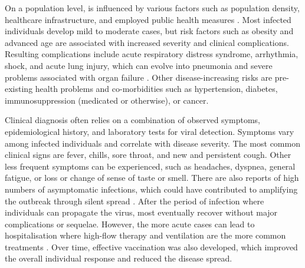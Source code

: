 On a population level, \covid is influenced by various factors such as population density, healthcare infrastructure, and employed public health measures \citep{halaji2021EpidemiologyCOVID19}.
Most infected individuals develop mild to moderate cases, but risk factors such as obesity and advanced age are associated with increased severity and clinical complications.
Resulting complications include acute respiratory distress syndrome, arrhythmia, shock, and acute lung injury, which can evolve into pneumonia and severe problems associated with organ failure \citep{wang2020ClinicalCharacteristics, lamers2022SARSCoV2Pathogenesis}.
Other disease-increasing risks are pre-existing health problems and co-morbidities such as hypertension, diabetes, immunosuppression (medicated or otherwise), or cancer.


Clinical diagnosis often relies on a combination of observed symptoms, epidemiological history, and laboratory tests for viral detection.
Symptoms vary among infected individuals and correlate with disease severity.
The most common clinical signs are fever, chills, sore throat, and new and persistent cough.
Other less frequent symptoms can be experienced, such as headaches, dyspnea, general fatigue, or loss or change of sense of taste or smell.
There are also reports of high numbers of asymptomatic infections, which could have contributed to amplifying the outbreak through silent spread \citep{worldhealthorganizationCoronavirusDisease}.
After the period of infection where individuals can propagate the virus, most eventually recover without major complications or sequelae.
However, the more acute cases can lead to hospitalisation where high-flow therapy and ventilation are the more common treatments \citep{wang2020ClinicalCharacteristics}.
Over time, effective vaccination was also developed, which improved the overall individual response and reduced the disease spread.

